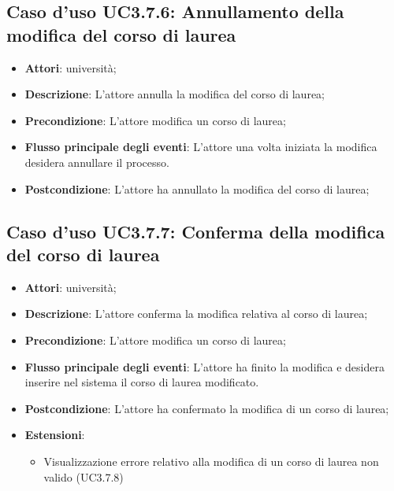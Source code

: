 \subsection{Caso d'uso \texorpdfstring{UC3.7.6}{UC3.7.6}: Annullamento della modifica del corso di laurea}
\begin{itemize}
\item \textbf{Attori}: università;
\item \textbf{Descrizione}: L'attore annulla la modifica del corso di laurea;

\item \textbf{Precondizione}: L'attore modifica un corso di laurea;

\item \textbf{Flusso principale degli eventi}: L'attore una volta iniziata la modifica desidera annullare il processo.

\item \textbf{Postcondizione}: L'attore ha annullato la modifica del corso di laurea;

\end{itemize}
\subsection{Caso d'uso \texorpdfstring{UC3.7.7}{UC3.7.7}: Conferma della modifica del corso di laurea}
\begin{itemize}
\item \textbf{Attori}: università;
\item \textbf{Descrizione}: L'attore conferma la modifica relativa al corso di laurea;

\item \textbf{Precondizione}: L'attore modifica un corso di laurea;

\item \textbf{Flusso principale degli eventi}: L'attore ha finito la modifica e desidera inserire nel sistema il corso di laurea modificato.

\item \textbf{Postcondizione}: L'attore ha confermato la modifica di un corso di laurea;

\item \textbf{Estensioni}:
\begin{itemize}
\item Visualizzazione errore relativo alla modifica di un corso di laurea non valido (UC3.7.8)
\end{itemize}
\end{itemize}
